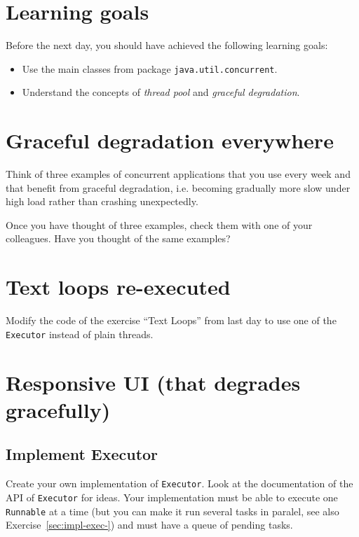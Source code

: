 \documentclass{article}
\begin{document}
\section*{Learning goals}
\label{sec:learning-goals}

Before the next day, you should have achieved the following learning
goals: 

\begin{itemize}
\item Use the main classes from package \verb+java.util.concurrent+.
\item Understand the concepts of \emph{thread pool} and \emph{graceful
  degradation}.
\end{itemize}

\section{Graceful degradation everywhere}
\label{sec:grac-degr-everywh}

Think of three examples of concurrent applications that you use every
week and that benefit from graceful degradation, i.e. becoming
gradually more slow under high load rather than crashing unexpectedly.

Once you have thought of three examples, check them with one of your
colleagues. Have you thought of the same examples?

\section{Text loops re-executed}
\label{sec:text-loops}

Modify the code of the exercise ``Text Loops'' from last day to use
one of the \verb+Executor+ instead of plain threads. 


\section{Responsive UI (that degrades gracefully)}
\label{sec:responsive-ui-that}

\subsection{Implement Executor}
\label{sec:implement-executor}

Create your own implementation of \verb+Executor+. Look at the
documentation of the API of \verb+Executor+ for ideas. Your
implementation must be able to execute one \verb+Runnable+ at a time
(but you can make it run several tasks in paralel, see also
Exercise~\ref{sec:impl-exec-}) and must have a queue of pending
tasks. 
\end{document}
